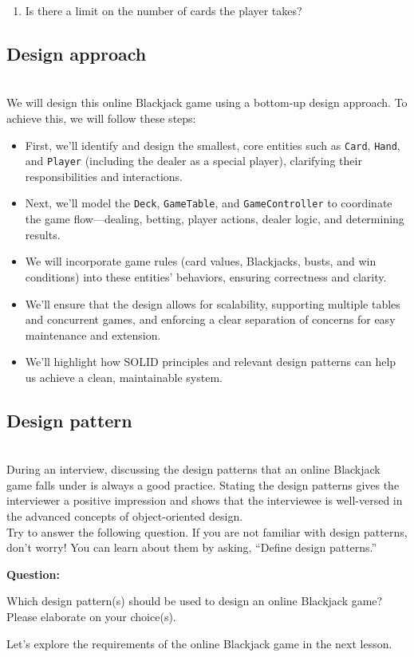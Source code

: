 \begin{enumerate}
\item
Is there a limit on the number of cards the player takes?
\end{enumerate}

\subsection{Design approach}\label{nMxzgcL9_8ud3YtB3Weie}
\\
We will design this online Blackjack game using a bottom-up design approach. To achieve this, we will follow these steps:

\begin{itemize}
\item
First, we'll identify and design the smallest, core entities such as \texttt{Card}, \texttt{Hand}, and \texttt{Player} (including the dealer as a special player), clarifying their responsibilities and interactions.
\item
Next, we'll model the \texttt{Deck}, \texttt{GameTable}, and \texttt{GameController} to coordinate the game flow---dealing, betting, player actions, dealer logic, and determining results.
\item
We will incorporate game rules (card values, Blackjacks, busts, and win conditions) into these entities' behaviors, ensuring correctness and clarity.
\item
We'll ensure that the design allows for scalability, supporting multiple tables and concurrent games, and enforcing a clear separation of concerns for easy maintenance and extension.
\item
We'll highlight how SOLID principles and relevant design patterns can help us achieve a clean, maintainable system.
\end{itemize}

\subsection{Design pattern~}\label{ZrZ5MDGLUDSdWp0KcJgGF}
\\
During an interview, discussing the design patterns that an online Blackjack game falls under is always a good practice. Stating the design patterns gives the interviewer a positive impression and shows that the interviewee is well-versed in the advanced concepts of object-oriented design.
\\
Try to answer the following question. If you are not familiar with design patterns, don't worry! You can learn about them by asking, ``Define design patterns.''

\textbf{Question:}

Which design pattern(s) should be used to design an online Blackjack game? Please elaborate on your choice(s).

Let's explore the requirements of the online Blackjack game in the next lesson.

\subsection{}\label{d3Pm1FQEShUrw4RLRwW-a}

